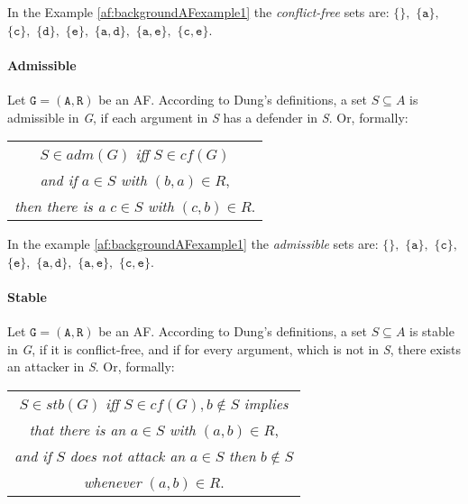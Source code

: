 In the Example \cref{af:backgroundAFexample1} the \emph{conflict-free} sets are:
$\mathtt{\{\}},$
$\mathtt{\{a\}},$
$\mathtt{\{c\}},$
$\mathtt{\{d\}},$
$\mathtt{\{e\}},$
$\mathtt{\{a, d\}},$
$\mathtt{\{a, e\}},$
$\mathtt{\{c, e\}}$.

\paragraph{Admissible} Let $\mathtt{G=(A,R)}$ be an AF. According to Dung's definitions, a set $S \subseteq A$ is admissible in \textit{G}, if each argument in \textit{S} has a defender in \textit{S}. Or, formally:

\begin{center}
    \begin{tabular}{c}
        $S \in adm(G)$ \textit{iff} $S \in cf(G)$\\

        \textit{and if} $a \in S$ \textit{with} $(b, a) \in R$,\\

        \textit{then there is a} $c \in S$ \textit{with} $(c, b) \in R$.
    \end{tabular}
\end{center}

In the example \cref{af:backgroundAFexample1} the \emph{admissible} sets are:
$\mathtt{\{\}},$
$\mathtt{\{a\}},$
$\mathtt{\{c\}},$
$\mathtt{\{e\}},$
$\mathtt{\{a, d\}},$
$\mathtt{\{a, e\}},$
$\mathtt{\{c, e\}}$.


\paragraph{Stable} Let $\mathtt{G=(A,R)}$ be an AF. According to Dung's definitions, a set $S \subseteq A$ is stable in \textit{G}, if it is conflict-free, and if for every argument, which is not in \textit{S}, there exists an attacker in \textit{S}. Or, formally:

\begin{center}
    \begin{tabular}{c}
        $S \in stb(G)$ \textit{iff} $S \in cf(G),  b \not\in S$ \textit{implies}\\

        \textit{that there is an} $a \in S$ \textit{with} $(a, b) \in R$,\\

        \textit{and if} $S$ \textit{does not attack an} $a \in S$ \textit{then} $b \not\in S$\\

        \textit{whenever} $(a, b) \in R$.
    \end{tabular}
\end{center}


